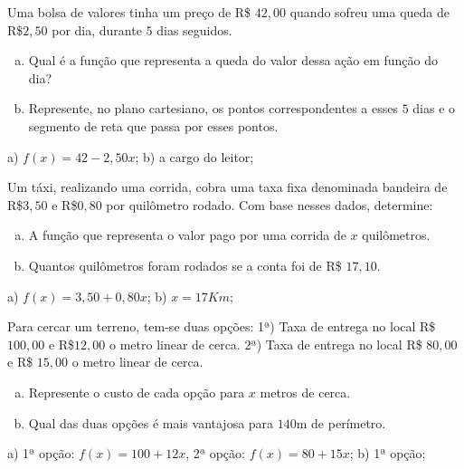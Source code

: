 \begin{secExercicios}
    \begin{exer}
 Uma bolsa de valores tinha um preço de R\$ $42,00$ quando sofreu uma queda de R\$$2,50$ por dia, durante $5$ dias seguidos.
  \begin{enumerate}[a)]
  \item Qual é a função que representa a queda do valor dessa ação em função do dia?
  \item Represente, no plano cartesiano, os pontos correspondentes a esses $5$ dias e o segmento de reta que passa por esses pontos.
  \end{enumerate}
  \end{exer}
  \begin{resp}
    a) $f(x)= 42 - 2,50 x$; b) a cargo do leitor;
  \end{resp}
  
  \begin{exer}
  Um táxi, realizando uma corrida, cobra uma taxa fixa denominada bandeira de R\$$3,50$ e R\$$0,80$ por quilômetro rodado.
  Com base nesses dados, determine:
  \begin{enumerate}[a)]
  \item A função que representa o valor pago por uma corrida de $x$ quilômetros.
  \item Quantos quilômetros foram rodados se a conta foi de R\$ $17,10$.
  \end{enumerate}
  \end{exer}
  \begin{resp}
    a) $f(x)= 3,50 + 0,80 x$; b) $x= 17 Km$;
  \end{resp}
  
  \begin{exer}
  Para cercar um terreno, tem-se duas opções:
  1ª) Taxa de entrega no local R\$ $100,00$ e R\$$12,00$ o metro linear de cerca.
  2ª) Taxa de entrega no local R\$ $80,00$ e R\$ $15,00$ o metro linear de cerca.
  \begin{enumerate}[a)]
  \item Represente o custo de cada opção para $x$ metros de cerca.
  \item Qual das duas opções é mais vantajosa para $140$m de perímetro.
  \end{enumerate}
  \end{exer}
  \begin{resp}
    a) 1ª opção: $f(x)= 100 + 12x$, 2ª opção: $f(x)= 80+15x$; b) 1ª opção; 
  \end{resp}
  

\end{secExercicios}
